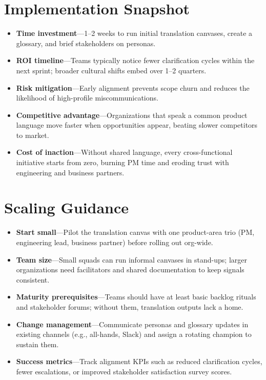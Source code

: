 \section{Implementation Snapshot}
\label{sec:intro-snapshot}
\begin{itemize}
    \item \textbf{Time investment}—1--2 weeks to run initial translation canvases, create a glossary, and brief stakeholders on personas.
    \item \textbf{ROI timeline}—Teams typically notice fewer clarification cycles within the next sprint; broader cultural shifts embed over 1--2 quarters.
    \item \textbf{Risk mitigation}—Early alignment prevents scope churn and reduces the likelihood of high-profile miscommunications.
    \item \textbf{Competitive advantage}—Organizations that speak a common product language move faster when opportunities appear, beating slower competitors to market.
    \item \textbf{Cost of inaction}—Without shared language, every cross-functional initiative starts from zero, burning PM time and eroding trust with engineering and business partners.
\end{itemize}

\section{Scaling Guidance}
\label{sec:intro-scaling}
\begin{itemize}
    \item \textbf{Start small}—Pilot the translation canvas with one product-area trio (PM, engineering lead, business partner) before rolling out org-wide.
    \item \textbf{Team size}—Small squads can run informal canvases in stand-ups; larger organizations need facilitators and shared documentation to keep signals consistent.
    \item \textbf{Maturity prerequisites}—Teams should have at least basic backlog rituals and stakeholder forums; without them, translation outputs lack a home.
    \item \textbf{Change management}—Communicate personas and glossary updates in existing channels (e.g., all-hands, Slack) and assign a rotating champion to sustain them.
    \item \textbf{Success metrics}—Track alignment KPIs such as reduced clarification cycles, fewer escalations, or improved stakeholder satisfaction survey scores.
\end{itemize}
